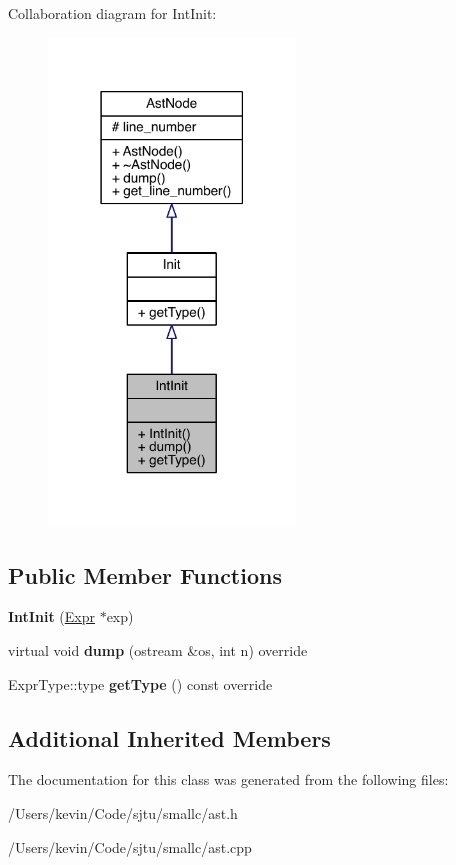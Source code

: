 Collaboration diagram for Int\+Init\+:\nopagebreak
\begin{figure}[H]
\begin{center}
\leavevmode
\includegraphics[width=186pt]{class_int_init__coll__graph}
\end{center}
\end{figure}
\subsection*{Public Member Functions}
\begin{DoxyCompactItemize}
\item 
\mbox{\label{class_int_init_a901a68a61f2ddc6ea793ef14e7347a1e}} 
{\bfseries Int\+Init} (\hyperlink{class_expr}{Expr} $\ast$exp)
\item 
\mbox{\label{class_int_init_a7c5c03fd5e739570544f72fd9f84bbbf}} 
virtual void {\bfseries dump} (ostream \&os, int n) override
\item 
\mbox{\label{class_int_init_a94e524ddfcd5d7df7ed9b200484eaaef}} 
Expr\+Type\+::type {\bfseries get\+Type} () const override
\end{DoxyCompactItemize}
\subsection*{Additional Inherited Members}


The documentation for this class was generated from the following files\+:\begin{DoxyCompactItemize}
\item 
/\+Users/kevin/\+Code/sjtu/smallc/ast.\+h\item 
/\+Users/kevin/\+Code/sjtu/smallc/ast.\+cpp\end{DoxyCompactItemize}

